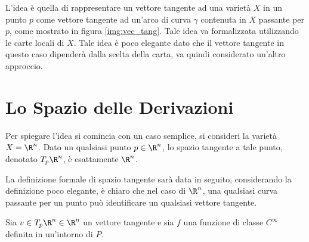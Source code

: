 \documentclass[10pt, letterpaper]{report}
\begin{document}
L'idea è quella di rappresentare un vettore tangente ad una varietà $X$ in un punto $p$ come vettore tangente ad un'arco di curva $\gamma$ contenuta in $X$ passante per $p$, come mostrato in figura \ref{img:vec_tang}. Tale idea va formalizzata utilizzando le carte locali di $X$. Tale idea è poco elegante dato che il vettore tangente in questo caso dipenderà dalla scelta della carta, va quindi considerato un'altro approccio.\section{Lo Spazio delle Derivazioni}
Per spiegare l'idea si comincia con un caso semplice, si consideri la varietà $X=\R^n$. Dato un qualsiasi punto $p\in\R^n$, lo spazio tangente a tale punto, denotato $T_p\R^n$, è esattamente $\R^n$.\bigskip

La definizione formale di spazio tangente sarà data in seguito, considerando la definizione poco elegante, è chiaro che nel caso di $\R^n$, una qualsiasi curva passante per un punto può identificare un qualsiasi vettore tangente.
\bigskip

Sia $v\in T_p\R^n\in\R^n$ un vettore tangente e sia $f$ una funzione di classe $C^\infty$ definita in un'intorno di $P$.
\end{document}
